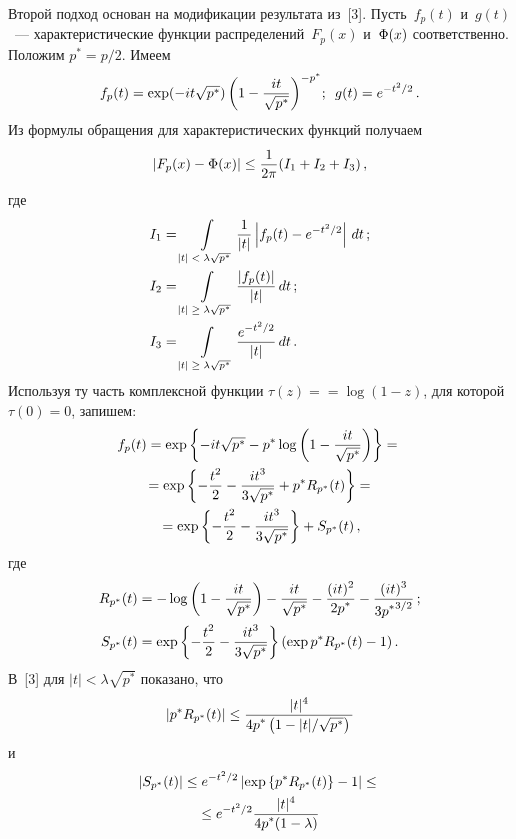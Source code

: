 \begin{multicols}{2}
Второй подход основан на модификации результата из~[3].
Пусть~$f_p(t)$ и~$g(t)$~--- характеристические функции распределений~$F_p(x)$ и~$\IP(x)$ соответственно.
Положим $p^*=p/2$. Имеем
\begin{equation*}
f_p(t) = \exp(-it \sqrt{p^*}) \left(1 -\fr{it}{\sqrt{p^*}}\right)^{-p^*}\!\,\!;\enskip
g(t) = e^{-t^2/2}\,.
\end{equation*}
Из формулы обращения для характеристических функций получаем
\begin{equation*}
|F_p(x) - \IP(x)| \le \fr{1}{2\pi} (I_1 + I_2 +I_3)\,,
\end{equation*}
где
\begin{align*}
I_1 &= \int\limits_{|t|\; < \;\lambda \sqrt{p^*}} \fr{1}{|t|}\left| f_p(t) - e^{-t^2/2}\right|\,dt\,;\\
I_2 &= \int\limits_{|t|\; \ge \;\lambda \sqrt{p^*}} \fr{|f_p(t)|}{|t|}\,dt\,;\\
I_3 &= \int\limits_{|t| \;\ge\; \lambda \sqrt{p^*}} \fr{e^{-t^2/2}}{|t|}\,dt\,.
\end{align*}
Используя ту часть комплексной функции $\tau (z) =$\linebreak $= \log (1- z )$,  для которой $\tau(0)=0$,
запишем:
\begin{multline*}
f_p(t) = \exp \left\{-it \sqrt{p^*} -p^* \log\left(1 - \fr{it}{\sqrt{p^*}}\right)\right \} ={}\\
{}=
\exp \left\{- \fr{t^2}{2} - \fr{it^3}{3\sqrt{p^*}} + p^* R_{p^*}(t) \right \}={}\\
{}       = \exp \left\{- \fr{t^2}{2} - \fr{it^3}{3\sqrt{p^*}} \right \}+ S_{p^*}(t)\,,
\end{multline*}
где
\begin{align*}
 R_{p^*}(t) &= - \log \left(1 - \fr{it}{\sqrt{p^*}}\right) -\fr{it}{\sqrt{p^*}}
 - \fr{(it)^2}{2p^*} -\fr{(it)^3}{3{p^*}^{3/2}}\,;\\
 S_{p^*}(t) &= \exp\left\{-\fr{t^2}{2} - \fr{it^3}{3\sqrt{p^*}}\right\}(\exp{p^* R_{p^*}(t)} -1)\,.
\end{align*}
В~[3] для  $|t| < \lambda \sqrt{p^*}$  показано, что
\begin{equation*}
\left\vert p^* R_{p^*}(t)\right\vert \leq \fr{|t|^4}{4p^*\left(1 -|t|/\sqrt{p^*}\right)}
\end{equation*}
и
\begin{multline*}
\left\vert S_{p^*}(t)\right\vert \leq e^{-t^2/2} \left\vert \exp \left\{p^* R_{p^*}(t)\right\} - 1\right\vert \leq{}\\
{}\leq e^{-t^2/2} \fr{|t|^4}{4p^* (1-\lambda)}\,

\end{multline*}
\end{multicols}

